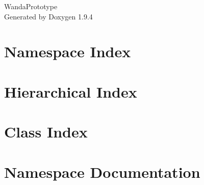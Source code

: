 \documentclass[twoside]{book}
\newcommand{\+}{\discretionary{\mbox{\scriptsize$\hookleftarrow$}}{}{}}
\newcommand{\clearemptydoublepage}{%
    \newpage{\pagestyle{empty}\cleardoublepage}%
  }
\begin{document}
  \raggedbottom
    \hypersetup{pageanchor=false,
                bookmarksnumbered=true,
                pdfencoding=unicode
               }
  \begin{titlepage}
  \vspace*{7cm}
  \begin{center}%
  {\Large Wanda\+Prototype}\\
  \vspace*{1cm}
  {\large Generated by Doxygen 1.9.4}\\
  \end{center}
  \end{titlepage}
  \clearemptydoublepage
  \tableofcontents
  \clearemptydoublepage
  \hypersetup{pageanchor=true}
\chapter{Namespace Index}

\chapter{Hierarchical Index}

\chapter{Class Index}

\chapter{Namespace Documentation}

\end{document}
